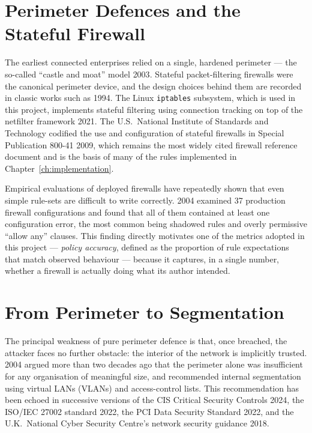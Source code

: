 \section{Perimeter Defences and the Stateful Firewall}

The earliest connected enterprises relied on a single, hardened perimeter --- the so-called ``castle and moat'' model \parencite{Cheswick, Bellovin and Rubin}{2003}. Stateful packet-filtering firewalls were the canonical perimeter device, and the design choices behind them are recorded in classic works such as \textcite{Bellovin and Cheswick}{1994}. The Linux \texttt{iptables} subsystem, which is used in this project, implements stateful filtering using connection tracking on top of the netfilter framework \parencite{Tanenbaum and Wetherall}{2021}. The U.S.\ National Institute of Standards and Technology codified the use and configuration of stateful firewalls in Special Publication 800-41 \parencite{Scarfone and Hoffman}{2009}, which remains the most widely cited firewall reference document and is the basis of many of the rules implemented in Chapter~\ref{ch:implementation}.

Empirical evaluations of deployed firewalls have repeatedly shown that even simple rule-sets are difficult to write correctly. \textcite{Wool}{2004} examined 37 production firewall configurations and found that all of them contained at least one configuration error, the most common being shadowed rules and overly permissive ``allow any'' clauses. This finding directly motivates one of the metrics adopted in this project --- \emph{policy accuracy}, defined as the proportion of rule expectations that match observed behaviour --- because it captures, in a single number, whether a firewall is actually doing what its author intended.

\section{From Perimeter to Segmentation}

The principal weakness of pure perimeter defence is that, once breached, the attacker faces no further obstacle: the interior of the network is implicitly trusted. \textcite{Convery}{2004} argued more than two decades ago that the perimeter alone was insufficient for any organisation of meaningful size, and recommended internal segmentation using virtual LANs (VLANs) and access-control lists. This recommendation has been echoed in successive versions of the CIS Critical Security Controls \parencite{CIS}{2024}, the ISO/IEC 27002 standard \parencite{ISO/IEC}{2022}, the PCI Data Security Standard \parencite{PCI Security Standards Council}{2022}, and the U.K.\ National Cyber Security Centre's network security guidance \parencite{NCSC}{2018}.

